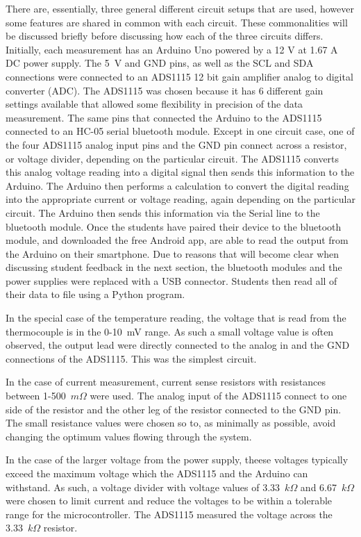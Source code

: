 There are, essentially, three general different circuit setups that are used, however some features are shared in common with each circuit.
These commonalities will be discussed briefly before discussing how each of the three circuits differs.
Initially, each measurement has an Arduino Uno powered by a 12 V at 1.67 A DC power supply.
The 5~V and GND pins, as well as the SCL and SDA connections were connected to an ADS1115 12 bit gain amplifier analog to digital converter (ADC).
The ADS1115 was chosen because it has 6 different gain settings available that allowed some flexibility in precision of the data measurement.
The same pins that connected the Arduino to the ADS1115 connected to an HC-05 serial bluetooth module.
Except in one circuit case, one of the four ADS1115 analog input pins and the GND pin connect across a resistor, or voltage divider, depending on the particular circuit.
The ADS1115 converts this analog voltage reading into a digital signal then sends this information to the Arduino.
The Arduino then performs a calculation to convert the digital reading into the appropriate current or voltage reading, again depending on the particular circuit.
The Arduino then sends this information via the Serial line to the bluetooth module.
Once the students have paired their device to the bluetooth module, and downloaded the free Android app, are able to read the output from the Arduino on their smartphone.
Due to reasons that will become clear when discussing student feedback in the next section, the bluetooth modules and the power supplies were replaced with a USB connector.
Students then read all of their data to file using a Python program.

In the special case of the temperature reading, the voltage that is read from the thermocouple is in the 0-10~mV range.
As such a small voltage value is often observed, the output lead were directly connected to the analog in and the GND connections of the ADS1115.
This was the simplest circuit.

In the case of current measurement, current sense resistors with resistances between 1-500~$m\Omega$ were used.
The analog input of the ADS1115 connect to one side of the resistor and the other leg of the resistor connected to the GND pin.
The small resistance values were chosen so to, as minimally as possible, avoid changing the optimum values flowing through the system.

In the case of the larger voltage from the power supply, theese voltages typically exceed the maximum voltage which the ADS1115 and the Arduino can withstand.
As such, a voltage divider  with voltage values of 3.33~$k\Omega$ and 6.67~$k\Omega$ were chosen to limit current and reduce the voltages to be within a tolerable range for the microcontroller.
The ADS1115 measured the voltage across the 3.33~$k\Omega$ resistor.

